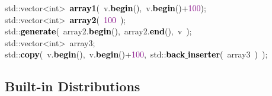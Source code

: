                         \noindent
                        \mbox{}std\textcolor{BrickRed}{::}\textcolor{TealBlue}{vector\textless{}int\textgreater{}}\ \textbf{\textcolor{Black}{array1}}\textcolor{BrickRed}{(}\ v\textcolor{BrickRed}{.}\textbf{\textcolor{Black}{begin}}\textcolor{BrickRed}{(),}\ v\textcolor{BrickRed}{.}\textbf{\textcolor{Black}{begin}}\textcolor{BrickRed}{()+}\textcolor{Purple}{100}\textcolor{BrickRed}{);} \\
                        \mbox{}std\textcolor{BrickRed}{::}\textcolor{TealBlue}{vector\textless{}int\textgreater{}}\ \textbf{\textcolor{Black}{array2}}\textcolor{BrickRed}{(}\ \textcolor{Purple}{100}\ \textcolor{BrickRed}{);}\  \\
                        \mbox{}std\textcolor{BrickRed}{::}\textbf{\textcolor{Black}{generate}}\textcolor{BrickRed}{(}\ array2\textcolor{BrickRed}{.}\textbf{\textcolor{Black}{begin}}\textcolor{BrickRed}{(),}\ array2\textcolor{BrickRed}{.}\textbf{\textcolor{Black}{end}}\textcolor{BrickRed}{(),}\ v\ \textcolor{BrickRed}{);} \\
                        \mbox{}std\textcolor{BrickRed}{::}\textcolor{TealBlue}{vector\textless{}int\textgreater{}}\ array3\textcolor{BrickRed}{;}\  \\
                        \mbox{}std\textcolor{BrickRed}{::}\textbf{\textcolor{Black}{copy}}\textcolor{BrickRed}{(}\ v\textcolor{BrickRed}{.}\textbf{\textcolor{Black}{begin}}\textcolor{BrickRed}{(),}\ v\textcolor{BrickRed}{.}\textbf{\textcolor{Black}{begin}}\textcolor{BrickRed}{()+}\textcolor{Purple}{100}\textcolor{BrickRed}{,}\ std\textcolor{BrickRed}{::}\textbf{\textcolor{Black}{back$\_$inserter}}\textcolor{BrickRed}{(}\ array3\ \textcolor{BrickRed}{)}\ \textcolor{BrickRed}{);} \\
                        \mbox{}


\subsection{Built-in Distributions}

